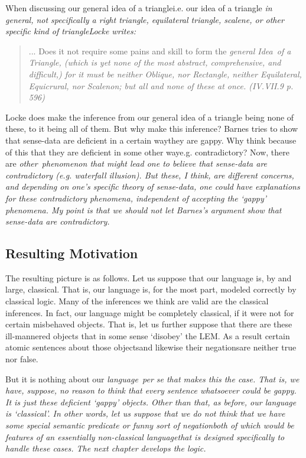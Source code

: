 When discussing our general idea of a triangle\textemdash i.e. our idea of a triangle \em in general\em, not specifically a right triangle, equilateral triangle, scalene, or other specific kind of triangle\textemdash Locke writes:

\begin{quote}
... Does it not require some pains and skill to form the \em general Idea\em\ of a \em Triangle\em, (which is yet none of the most abstract, comprehensive, and difficult,) for it must be neither Oblique, nor Rectangle, neither Equilateral, Equicrural, nor Scalenon; but all and none of these at once. (IV.VII.9 p. 596)
\end{quote}
Locke does make the inference from our general idea of a triangle being none of these, to it being all of them. But why make this inference? Barnes tries to show that sense-data are deficient in a certain way\textemdash they are gappy. Why think because of this that they are deficient in some other way\textemdash e.g. contradictory? Now, there are \em other\em\ phenomenon that might lead one to believe that sense-data are contradictory (e.g. waterfall illusion). But these, I think, are different concerns, and depending on one's specific theory of sense-data, one could have explanations for these contradictory phenomena, independent of accepting the `gappy' phenomena. My point is that we should not let Barnes's argument show that sense-data are contradictory.

\subsection{Resulting Motivation}

The resulting picture is as follows. Let us suppose that our language is, by and large, classical. That is, our language is, for the most part, modeled correctly by classical logic. Many of the inferences we think are valid are the classical inferences. In fact, our language might be completely classical, if it were not for certain misbehaved objects. That is, let us further suppose that there are these ill-mannered objects that in some sense `disobey' the LEM. As a result certain atomic sentences about those objects\textemdash and likewise their negations\textemdash are neither true nor false.

But it is nothing about our \em language\em\ per se that makes this the case. That is, we have, suppose, no reason to think that every sentence  whatsoever could be gappy. It is just these deficient `gappy' objects. Other than that, as before, our language is `classical'. In other words, let us suppose that we do not think that we have some special semantic predicate or funny sort of negation\textemdash both of which would be features of an essentially non-classical \em language\em\textemdash that is designed specifically to handle these cases. The next chapter develops the logic.

%
%
%


